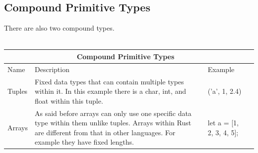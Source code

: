 \documentclass{article}
\theoremstyle{theorem}
\theoremstyle{definition}
\theoremstyle{remark}
\begin{document}
\subsection{Compound Primitive Types}
There are also two compound types.\cite{UPD} 
 \\ 
  \\ 
\begin{center}
\begin{tabular}{ |p{5cm}||p{5cm}|p{5cm}|p{5cm}|  }
 \hline
 \multicolumn{3}{|c|}{Compound Primitive Types} \\
 \hline
 Name & Description & Example\\
 \hline
 Tuples   & Fixed data types that can contain multiple types within it. In this example there is a char, int, and float within this tuple.
    &('a', 1, 2.4) \\
    \hline
 Arrays &  As said before arrays can only use one specific data type within them unlike tuples. Arrays within Rust are different from that in other languages. For example they have fixed lengths. & let a = [1, 2, 3, 4, 5]; \\
  \hline
\end{tabular}
\end{center}
\end{document}
